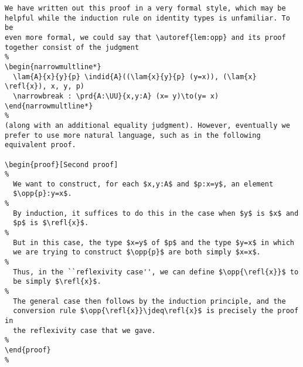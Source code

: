\documentclass[a4paper]{amsart}
\begin{document}
\begin{verbatim}
We have written out this proof in a very formal style, which may be 
helpful while the induction rule on identity types is unfamiliar. To be 
even more formal, we could say that \autoref{lem:opp} and its proof 
together consist of the judgment
%
\begin{narrowmultline*}
  \lam{A}{x}{y}{p} \indid{A}((\lam{x}{y}{p} (y=x)), (\lam{x} \refl{x}), x, y, p)
  \narrowbreak : \prd{A:\UU}{x,y:A} (x= y)\to(y= x)
\end{narrowmultline*}
%
(along with an additional equality judgment). However, eventually we 
prefer to use more natural language, such as in the following 
equivalent proof.

\begin{proof}[Second proof]
%
  We want to construct, for each $x,y:A$ and $p:x=y$, an element 
  $\opp{p}:y=x$.
%
  By induction, it suffices to do this in the case when $y$ is $x$ and 
  $p$ is $\refl{x}$.
%
  But in this case, the type $x=y$ of $p$ and the type $y=x$ in which 
  we are trying to construct $\opp{p}$ are both simply $x=x$.
%
  Thus, in the ``reflexivity case'', we can define $\opp{\refl{x}}$ to 
  be simply $\refl{x}$.
%
  The general case then follows by the induction principle, and the 
  conversion rule $\opp{\refl{x}}\jdeq\refl{x}$ is precisely the proof in 
  the reflexivity case that we gave.
%
\end{proof}
%
\end{verbatim}




\end{document}
